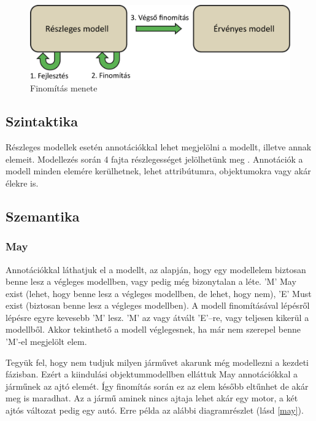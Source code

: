 \begin{figure}[!ht]
	\centering
	\includegraphics[width=130mm]{figures/finom.pdf}
	\caption{Finomítás menete} 
	\label{finomit}
\end{figure}

\subsection{Szintaktika}
Részleges modellek esetén annotációkkal lehet megjelölni a modellt, illetve annak elemeit. Modellezés során 4 fajta részlegességet jelölhetünk meg \cite{Salay}. Annotációk a modell minden elemére kerülhetnek, lehet attribútumra, objektumokra vagy akár élekre is.


\subsection{Szemantika}
\subsubsection{May}
Annotációkkal láthatjuk el a modellt, az alapján, hogy egy modellelem biztosan benne lesz a végleges modellben, vagy pedig még bizonytalan a léte. \textsf{’M’} May exist (lehet, hogy benne lesz a végleges modellben, de lehet, hogy nem), \textsf{’E’} Must exist (biztosan benne lesz a végleges modellben). A modell finomításával lépésről lépésre egyre kevesebb ’M’ lesz.  \textsf{’M’} az vagy átvált \textsf{’E’}–re, vagy teljesen kikerül a modellből. Akkor tekinthető a modell véglegesnek, ha már nem szerepel benne \textsf{’M’}-el megjelölt elem.
\par
Tegyük fel, hogy nem tudjuk milyen járművet akarunk még modellezni a kezdeti fázisban. Ezért a kiindulási objektummodellben elláttuk May annotációkkal a járműnek az ajtó elemét. Így finomítás során ez az elem később eltűnhet de akár meg is maradhat. Az a jármű aminek nincs ajtaja lehet akár egy motor, a két ajtós változat pedig egy autó. Erre példa az alábbi diagramrészlet (lásd \autoref{may}).

